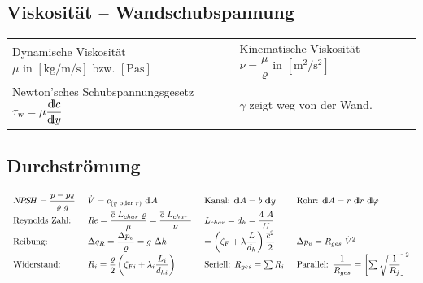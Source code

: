 \subsection{Viskosität -- Wandschubspannung}
	\begin{center}
		\setlength{\tabcolsep}{2em} %
		\begin{tabular}{ll}
		      Dynamische Viskosität $ \mu \text{ in } \left[\unit{\kg\per\m\per\s}\right] \text{ bzw. } \left[\unit{\Pa\s}\right] $
			& Kinematische Viskosität $ \nu = \dfrac{\mu}{\varrho} \text{ in } \left[\unit{\m\squared \per\s\squared}\right] $
			\\
			  Newton'sches Schubspannungsgesetz $ \tau_{\textsl{w}} = \mu \dfrac{{\operatorname{d\!l}} c}{{\operatorname{d\!l}} y} $
			& $\gamma$ zeigt weg von der Wand.
		\end{tabular}
	\end{center}

\subsection{Durchströmung}
	\setlength{\abovedisplayskip}{-15pt}
	\[ \arraycolsep=0.7em
		\begin{array}{llll}
			N\!P\!S\!H = \dfrac{p - p_d}{\varrho\ g} & \dot{V} = c_{(y \text{ oder } r)} \ \dd A                                                    & \text{Kanal: } \dd A = b\ \dd y                                          & \text{Rohr: } \dd A = r\ \dd r\ \dd\varphi \\
			\text{Reynolds Zahl:}                    & \Reyn = \dfrac{\overline{c}\ L_{char}\ \varrho}{\mu} = \dfrac{\overline{c}\ L_{char}\ }{\nu} & L_{char} = d_h = \dfrac{4\ A}{U}                                         &                                             \\
			\text{Reibung:}                          & \Delta q_R = \dfrac{\Delta p_v}{\varrho} = g\ \Delta h                                       & = \left( \zeta_F + \lambda \dfrac{L}{d_h} \right) \dfrac{\overline{c}^2}{2} & \Delta p_v = R_{ges}\ \dot{V}^2             \\
			\text{Widerstand:}                       & R_i = \dfrac{\varrho}{2}  \left( \zeta_{Fi} + \lambda_i \dfrac{L_i}{d_{hi}}\right)              & \text{Seriell: } R_{ges} = \sum R_i  & \text{Parallel: } \dfrac{1}{R_{ges}} = \left[\sum\sqrt{\dfrac{1}{R_j}}\right]^2
		\end{array}
	\]
